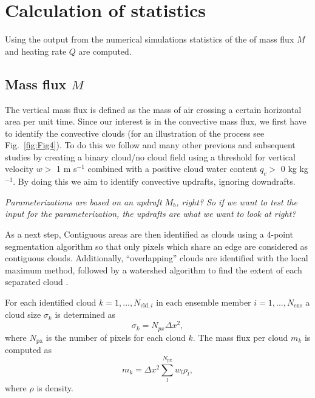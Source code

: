 \documentclass[a4paper, 12pt]{article}
\begin{document}
\section{Calculation of statistics}
Using the output from the numerical simulations statistics of the of mass flux $M$ and heating rate $Q$ are computed. 

\subsection{Mass flux $M$}
The vertical mass flux is defined as the mass of air crossing a certain horizontal area per unit time. Since our interest is in the convective mass flux, we first have to identify the convective clouds (for an illustration of the process see Fig.~\ref{fig:Fig4}). To do this we follow \cite{Cohen2006} and many other previous and subsequent studies by creating a binary cloud/no cloud field using a threshold for vertical velocity $w >$ 1 m s$^{-1}$ combined with a positive cloud water content $q_c >$ 0 kg kg$^{-1}$. By doing this we aim to identify convective updrafts, ignoring downdrafts.

\textit{Parameterizations are based on an updraft $M_b$, right? So if we want to test the input for the parameterization, the updrafts are what we want to look at right?}

As a next step, Contiguous areas are then identified as clouds using a 4-point segmentation algorithm so that only pixels which share an edge are considered as contiguous clouds. Additionally, ``overlapping'' clouds are identified with the local maximum method, followed by a watershed algorithm to find the extent of each separated cloud \citep{???}.


For each identified cloud $k=1,...,N_{\mathrm{cld},i}$ in each ensemble member $i=1,...,N_{\mathrm{ens}}$ a cloud size $\sigma_k$ is determined as
\begin{equation} \label{eq:cld_size}
 \sigma_k = N_{px} \Delta x^2,
\end{equation}
where $N_{\mathrm{px}}$ is the number of pixels for each cloud $k$. The mass flux per cloud $m_k$ is computed as
\begin{equation} \label{eq:mass_flux_per_cloud}
 m_k = \Delta x^2 \sum_{l}^{N_{\mathrm{px}}} w_l \rho_l,
\end{equation}
where $\rho$ is density.
\end{document}
